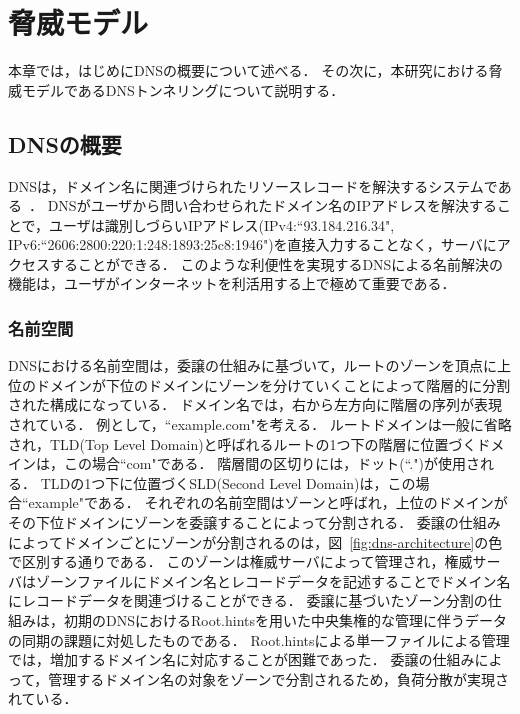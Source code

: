 \section{脅威モデル}
\label{sec:dns-tunneling}
本章では，はじめにDNSの概要について述べる．
その次に，本研究における脅威モデルであるDNSトンネリングについて説明する．

\subsection{DNSの概要}
\label{sec:dns-protocol}

DNSは，ドメイン名に関連づけられたリソースレコードを解決するシステムである~\cite{rfc1034, rfc1035}．
DNSがユーザから問い合わせられたドメイン名のIPアドレスを解決することで，ユーザは識別しづらいIPアドレス(IPv4:``93.184.216.34", IPv6:``2606:2800:220:1:248:1893:25c8:1946")を直接入力することなく，サーバにアクセスすることができる．
このような利便性を実現するDNSによる名前解決の機能は，ユーザがインターネットを利活用する上で極めて重要である．

\subsubsection{名前空間}
DNSにおける名前空間は，委譲の仕組みに基づいて，ルートのゾーンを頂点に上位のドメインが下位のドメインにゾーンを分けていくことによって階層的に分割された構成になっている．
ドメイン名では，右から左方向に階層の序列が表現されている．
例として，``example.com"を考える．
ルートドメインは一般に省略され，TLD(Top Level Domain)と呼ばれるルートの1つ下の階層に位置づくドメインは，この場合``com"である．
階層間の区切りには，ドット(``.")が使用される．
TLDの1つ下に位置づくSLD(Second Level Domain)は，この場合``example"である．
それぞれの名前空間はゾーンと呼ばれ，上位のドメインがその下位ドメインにゾーンを委譲することによって分割される．
委譲の仕組みによってドメインごとにゾーンが分割されるのは，図~\ref{fig:dns-architecture}の色で区別する通りである．
このゾーンは権威サーバによって管理され，権威サーバはゾーンファイルにドメイン名とレコードデータを記述することでドメイン名にレコードデータを関連づけることができる．
委譲に基づいたゾーン分割の仕組みは，初期のDNSにおけるRoot.hintsを用いた中央集権的な管理に伴うデータの同期の課題に対処したものである．
Root.hintsによる単一ファイルによる管理では，増加するドメイン名に対応することが困難であった．
委譲の仕組みによって，管理するドメイン名の対象をゾーンで分割されるため，負荷分散が実現されている．

